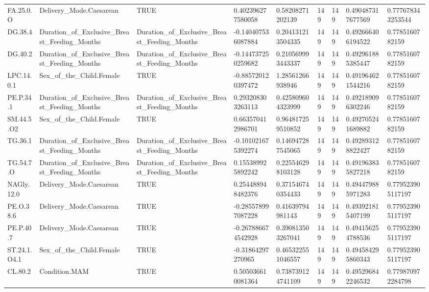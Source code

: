 \begin{longtable}{lllllllll}
FA.25.0.O & Delivery\_Mode.Caesarean & TRUE & 0.402396277580058 & 0.58208271202139 & 149 & 149 & 0.490487317677569 & 0.777678343253544 \\
DG.38.4 & Duration\_of\_Exclusive\_Breast\_Feeding\_Months & Duration\_of\_Exclusive\_Breast\_Feeding\_Months & -0.140407536087884 & 0.204131213504335 & 149 & 149 & 0.492666406194522 & 0.7785160782159 \\
DG.40.2 & Duration\_of\_Exclusive\_Breast\_Feeding\_Months & Duration\_of\_Exclusive\_Breast\_Feeding\_Months & -0.144737250259682 & 0.210569993443337 & 149 & 149 & 0.492961885385447 & 0.7785160782159 \\
LPC.14.0.1 & Sex\_of\_the\_Child.Female & TRUE & -0.885720120397472 & 1.28561266938946 & 149 & 149 & 0.491964621544216 & 0.7785160782159 \\
PE.P.34.1 & Duration\_of\_Exclusive\_Breast\_Feeding\_Months & Duration\_of\_Exclusive\_Breast\_Feeding\_Months & 0.293208303263113 & 0.425809604323999 & 149 & 149 & 0.492189096302246 & 0.7785160782159 \\
SM.44.5.O2 & Sex\_of\_the\_Child.Female & TRUE & 0.663570412986701 & 0.964817259510852 & 149 & 149 & 0.492705241689882 & 0.7785160782159 \\
TG.36.1 & Duration\_of\_Exclusive\_Breast\_Feeding\_Months & Duration\_of\_Exclusive\_Breast\_Feeding\_Months & -0.101021675392274 & 0.146947287545065 & 149 & 149 & 0.492893128822427 & 0.7785160782159 \\
TG.54.7.O & Duration\_of\_Exclusive\_Breast\_Feeding\_Months & Duration\_of\_Exclusive\_Breast\_Feeding\_Months & 0.155389925892242 & 0.225546298103128 & 149 & 149 & 0.491963835827218 & 0.7785160782159 \\
NAGly.12.0 & Delivery\_Mode.Caesarean & TRUE & 0.254488948482376 & 0.371546740354433 & 149 & 149 & 0.494479885971283 & 0.779523905117197 \\
PE.O.38.6 & Delivery\_Mode.Caesarean & TRUE & -0.285578997087228 & 0.41639794981143 & 149 & 149 & 0.493921815407199 & 0.779523905117197 \\
PE.P.40.7 & Delivery\_Mode.Caesarean & TRUE & -0.267886674542928 & 0.390813503267041 & 149 & 149 & 0.494156254788536 & 0.779523905117197 \\
ST.24.1.O4.1 & Sex\_of\_the\_Child.Female & TRUE & -0.31864297270965 & 0.465322551046557 & 149 & 149 & 0.494584295860343 & 0.779523905117197 \\
CL.80.2 & Condition.MAM & TRUE & 0.505036610081364 & 0.738739124741109 & 149 & 149 & 0.495296842246532 & 0.779870972284798 \\

\end{longtable}
